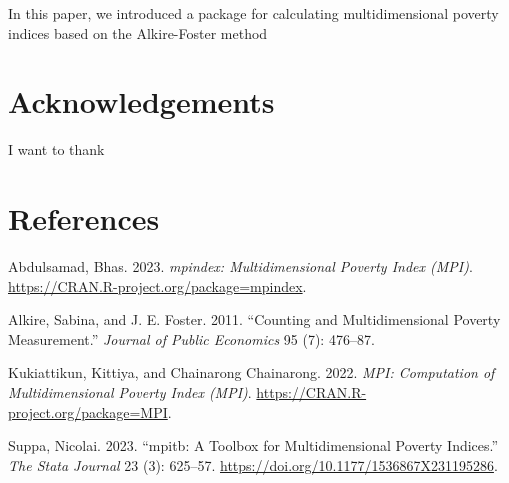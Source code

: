 In this paper, we introduced a package for calculating multidimensional poverty indices based on the Alkire-Foster method

\hypertarget{acknowledgements}{%
\section{Acknowledgements}\label{acknowledgements}}

I want to thank

\hypertarget{references}{%
\section*{References}\label{references}}

\hypertarget{refs}{}
\begin{CSLReferences}{1}{0}
\leavevmode{}%
Abdulsamad, Bhas. 2023. \emph{{m}pindex: Multidimensional Poverty Index (MPI)}. \url{https://CRAN.R-project.org/package=mpindex}.

\leavevmode{}%
Alkire, Sabina, and J. E. Foster. 2011. {``Counting and Multidimensional Poverty Measurement.''} \emph{Journal of Public Economics} 95 (7): 476--87.

\leavevmode{}%
Kukiattikun, Kittiya, and Chainarong Chainarong. 2022. \emph{MPI: Computation of Multidimensional Poverty Index (MPI)}. \url{https://CRAN.R-project.org/package=MPI}.

\leavevmode{}%
Suppa, Nicolai. 2023. {``{m}pitb: A Toolbox for Multidimensional Poverty Indices.''} \emph{The Stata Journal} 23 (3): 625--57. \url{https://doi.org/10.1177/1536867X231195286}.

\end{CSLReferences}



\address{%
Ignacio Girela\\
CONICET - Universidad Nacional de Córdoba\\%
Facultad de Ciencias Económicas\\ Córdoba, Argentina\\
%
\url{https://www.eco.unc.edu.ar/}\\%
\textit{ORCiD: \href{https://orcid.org/0000-0003-3297-3854}{0000-0003-3297-3854}}\\%
\href{mailto:ignacio.girela@unc.edu.ar}{\nolinkurl{ignacio.girela@unc.edu.ar}}%
}
